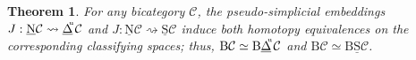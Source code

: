 \documentclass[]{amsart}
\newtheorem{theorem}{Theorem}[section]
\begin{document}
\begin{theorem}\label{psin}
For any bicategory ${\ensuremath{\mathcal{C}}}$, the pseudo-simplicial embeddings $J:{\ensuremath{\underline{\mathrm{N}}}}{\ensuremath{\mathcal{C}}} \rightsquigarrow
{\ensuremath{\underline{\Delta}}}\hspace{-3pt}^{^\mathrm{u}}{\ensuremath{\mathcal{C}}}$ and $J:{\ensuremath{\underline{\mathrm{N}}}}{\ensuremath{\mathcal{C}}}\rightsquigarrow \underline{\mathrm{ S}}{\ensuremath{\mathcal{C}}}$
induce both homotopy equivalences on the corresponding classifying spaces; thus, $ {\ensuremath{\mathrm{B}}}{\ensuremath{\mathcal{C}}}\simeq
{\ensuremath{\mathrm{B}}}{\ensuremath{\underline{\Delta}}}\hspace{-3pt}^{^\mathrm{u}}{\ensuremath{\mathcal{C}}} $ and ${\ensuremath{\mathrm{B}}}{\ensuremath{\mathcal{C}}}\simeq {\ensuremath{\mathrm{B}}}\underline{\mathrm{ S}}{\ensuremath{\mathcal{C}}}$.
\end{theorem}
\end{document}
